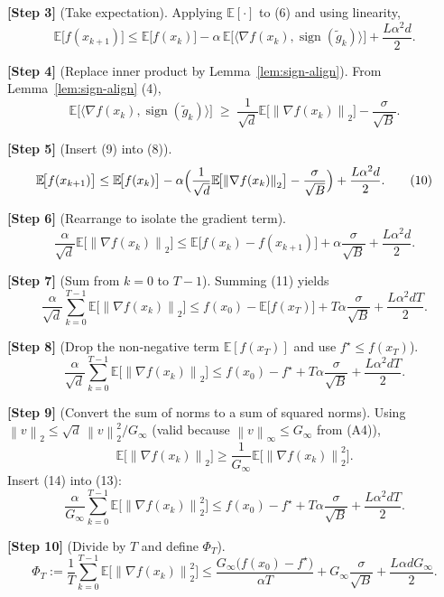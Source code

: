 \documentclass{article}
\newcommand{\sign}{\operatorname{sign}}
\newcommand{\EE}{\mathbb{E}}
\newcommand{\norm}[1]{\left\lVert#1\right\rVert}
\begin{document}
\noindent\textbf{[Step 3]} (Take expectation).  
Applying $\EE[\cdot]$ to (6) and using linearity,
\[
\EE\!\bigl[f(x_{k+1})\bigr]\le
\EE\!\bigl[f(x_{k})\bigr]
-\alpha\,\EE\!\bigl[\langle \nabla f(x_{k}),\sign(\tilde g_{k})\rangle\bigr]
+\frac{L\alpha^{2}d}{2}.
\tag{8}
\]

\noindent\textbf{[Step 4]} (Replace inner product by Lemma~\ref{lem:sign-align}).  
From Lemma~\ref{lem:sign-align} (4),
\[
\EE\!\bigl[\langle \nabla f(x_{k}),\sign(\tilde g_{k})\rangle\bigr]
\;\ge\;
\frac{1}{\sqrt{d}}\EE\!\bigl[\norm{\nabla f(x_{k})}_{2}\bigr]
-\frac{\sigma}{\sqrt{B}} .
\tag{9}
\]

\noindent\textbf{[Step 5]} (Insert (9) into (8)).  
\[
\EE\!\bigl[f(x_{k+1})\bigr]\le
\EE\!\bigl[f(x_{k})\bigr]
-\alpha\Bigl(\frac{1}{\sqrt{d}}\EE\!\bigl[\norm{\nabla f(x_{k})}_{2}\bigr]
-\frac{\sigma}{\sqrt{B}}\Bigr)
+\frac{L\alpha^{2}d}{2}.
\tag{10}
\]

\noindent\textbf{[Step 6]} (Rearrange to isolate the gradient term).  
\[
\frac{\alpha}{\sqrt{d}}\EE\!\bigl[\norm{\nabla f(x_{k})}_{2}\bigr]
\le
\EE\!\bigl[f(x_{k})-f(x_{k+1})\bigr]
+\alpha\frac{\sigma}{\sqrt{B}}
+\frac{L\alpha^{2}d}{2}.
\tag{11}
\]

\noindent\textbf{[Step 7]} (Sum from $k=0$ to $T-1$).  
Summing (11) yields
\[
\frac{\alpha}{\sqrt{d}}\sum_{k=0}^{T-1}\EE\!\bigl[\norm{\nabla f(x_{k})}_{2}\bigr]
\le
f(x_{0})- \EE\!\bigl[f(x_{T})\bigr]
+T\alpha\frac{\sigma}{\sqrt{B}}
+\frac{L\alpha^{2}dT}{2}.
\tag{12}
\]

\noindent\textbf{[Step 8]} (Drop the non‑negative term $\EE[f(x_{T})]$ and use $f^{\star}\le f(x_{T})$).  
\[
\frac{\alpha}{\sqrt{d}}\sum_{k=0}^{T-1}\EE\!\bigl[\norm{\nabla f(x_{k})}_{2}\bigr]
\le
f(x_{0})-f^{\star}
+T\alpha\frac{\sigma}{\sqrt{B}}
+\frac{L\alpha^{2}dT}{2}.
\tag{13}
\]

\noindent\textbf{[Step 9]} (Convert the sum of norms to a sum of squared norms).  
Using $\norm{v}_{2}\le \sqrt{d}\,\norm{v}_{2}^{2}/G_{\infty}$ (valid because $\norm{v}_{\infty}\le G_{\infty}$ from (A4)),
\[
\EE\!\bigl[\norm{\nabla f(x_{k})}_{2}\bigr]
\ge
\frac{1}{G_{\infty}}\EE\!\bigl[\norm{\nabla f(x_{k})}_{2}^{2}\bigr].
\tag{14}
\]
Insert (14) into (13):
\[
\frac{\alpha}{G_{\infty}}\sum_{k=0}^{T-1}\EE\!\bigl[\norm{\nabla f(x_{k})}_{2}^{2}\bigr]
\le
f(x_{0})-f^{\star}
+T\alpha\frac{\sigma}{\sqrt{B}}
+\frac{L\alpha^{2}dT}{2}.
\tag{15}
\]

\noindent\textbf{[Step 10]} (Divide by $T$ and define $\Phi_{T}$).  
\[
\Phi_{T}
:=\frac{1}{T}\sum_{k=0}^{T-1}\EE\!\bigl[\norm{\nabla f(x_{k})}_{2}^{2}\bigr]
\le
\frac{G_{\infty}\bigl(f(x_{0})-f^{\star}\bigr)}{\alpha T}
+G_{\infty}\frac{\sigma}{\sqrt{B}}
+\frac{L\alpha d G_{\infty}}{2}.
\tag{16}
\]
\end{document}

